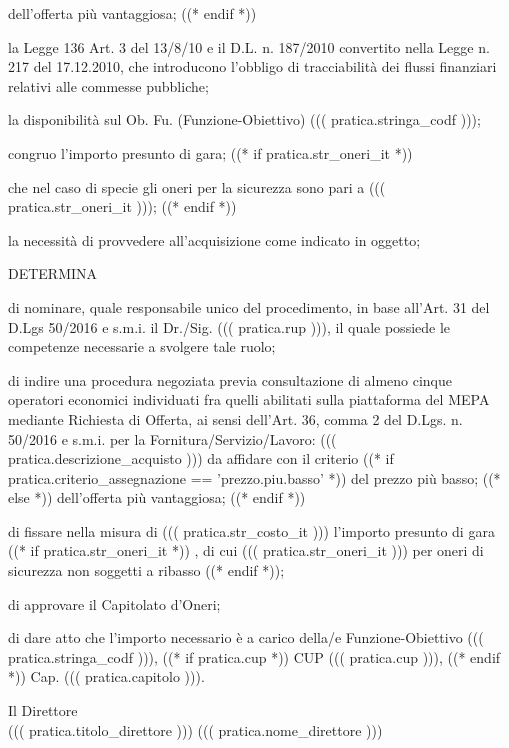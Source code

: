 \documentclass[a4paper,12pt]{letter}
\begin{document}
\begin{list}{VALUTATA}{}
dell'offerta più vantaggiosa;
   ((* endif *))
\item[VISTA] la Legge 136 Art. 3 del 13/8/10 e il D.L. n. 187/2010 convertito nella Legge 
        n. 217 del 17.12.2010, che introducono l'obbligo di tracciabilità dei flussi 
        finanziari relativi alle commesse pubbliche; 
\item[VISTA] la disponibilità sul Ob. Fu. (Funzione-Obiettivo) ((( pratica.stringa_codf ))); 
\item[VALUTATO] congruo l'importo presunto di gara;
((* if pratica.str_oneri_it *))
\item[RILEVATO] che nel caso di specie gli oneri per la sicurezza sono pari a ((( pratica.str_oneri_it )));
((* endif *))
\item[VALUTATA] la necessità di provvedere all'acquisizione come indicato in oggetto;
\end{list}



\begin{center}
DETERMINA
\end{center}

\begin{list}{VALUTATA}{}
\item[Art.~1:] di nominare, quale responsabile unico del procedimento, in base 
           all'Art. 31 del D.Lgs 50/2016 e s.m.i. il Dr./Sig. ((( pratica.rup ))),
           il quale possiede le competenze necessarie a svolgere tale ruolo; 
\item[Art.~2:] di indire una procedura negoziata previa consultazione di almeno cinque operatori
           economici individuati fra quelli abilitati
	   sulla piattaforma del MEPA mediante
           Richiesta di Offerta, ai sensi dell'Art. 36, comma 2 del D.Lgs. n. 50/2016 e s.m.i.
           per la Fornitura/Servizio/Lavoro: ((( pratica.descrizione_acquisto ))) da affidare con
           il criterio %
   ((* if pratica.criterio_assegnazione == 'prezzo.piu.basso' *)) %
del prezzo più basso;
   ((* else *)) %
dell'offerta più vantaggiosa;
   ((* endif *))

\item[Art.~3:] di fissare nella misura di ((( pratica.str_costo_it ))) l'importo presunto di gara%
((* if pratica.str_oneri_it *))%
, di cui ((( pratica.str_oneri_it ))) per oneri di sicurezza non soggetti a ribasso%
((* endif *));

\item[Art.~4:] di approvare il Capitolato d'Oneri;

\item[Art.~5:] di dare atto che l'importo necessario è a carico della/e Funzione-Obiettivo ((( pratica.stringa_codf ))), ((* if pratica.cup *)) CUP ((( pratica.cup ))), ((* endif *)) Cap. ((( pratica.capitolo ))).
\end{list}

\vspace{0.5cm}

\begin{flushright}
\begin{minipage}[t]{6cm}
\begin{center}
Il Direttore \\
((( pratica.titolo_direttore ))) ((( pratica.nome_direttore )))
\end{center}
\end{minipage}
\end{flushright}
\end{document}

